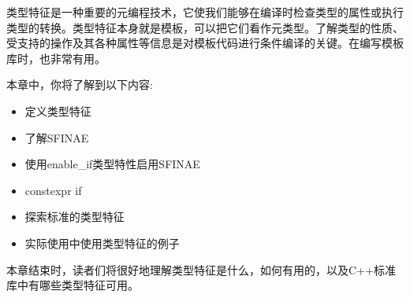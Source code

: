 类型特征是一种重要的元编程技术，它使我们能够在编译时检查类型的属性或执行类型的转换。类型特征本身就是模板，可以把它们看作元类型。了解类型的性质、受支持的操作及其各种属性等信息是对模板代码进行条件编译的关键。在编写模板库时，也非常有用。

本章中，你将了解到以下内容:

\begin{itemize}
\item
定义类型特征

\item
了解SFINAE

\item
使用enable\_if类型特性启用SFINAE

\item
constexpr if

\item
探索标准的类型特征

\item
实际使用中使用类型特征的例子
\end{itemize}

本章结束时，读者们将很好地理解类型特征是什么，如何有用的，以及C++标准库中有哪些类型特征可用。




























